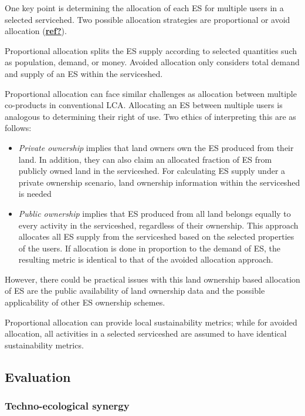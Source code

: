 \documentclass[
  14pt,
]{extarticle}
\begin{document}
One key point is determining the allocation of each ES for multiple users in a selected servicehed.
Two possible allocation strategies are proportional or avoid allocation (\protect\hyperlink{ref-ref}{\textbf{ref?}}).

Proportional allocation splits the ES supply according to selected quantities such as population, demand, or money.
Avoided allocation only considers total demand and supply of an ES within the serviceshed.

Proportional allocation can face similar challenges as allocation between multiple co-products in conventional LCA.
Allocating an ES between multiple users is analogous to determining their right of use. Two ethics of interpreting this are as follows:

\begin{itemize}
\item
  \emph{Private ownership} implies that land owners own the ES produced from their land. In addition, they can also claim an allocated fraction of ES from publicly owned land in the serviceshed.
  For calculating ES supply under a private ownership scenario, land ownership information within the serviceshed is needed
\item
  \emph{Public ownership} implies that ES produced from all land belongs equally to every activity in the serviceshed, regardless of their ownership.
  This approach allocates all ES supply from the serviceshed based on the selected properties of the users.
  If allocation is done in proportion to the demand of ES, the resulting metric is identical to that of the avoided allocation approach.
\end{itemize}

However, there could be practical issues with this land ownership based allocation of ES are the public availability of land ownership data and the possible applicability of other ES ownership schemes.

Proportional allocation can provide local sustainability metrics; while for avoided allocation, all activities in a selected serviceshed are assumed to have identical sustainability metrics.

\hypertarget{evaluation}{%
\subsection{Evaluation}\label{evaluation}}

\hypertarget{techno-ecological-synergy}{%
\subsubsection{Techno-ecological synergy}\label{techno-ecological-synergy}}
\end{document}
